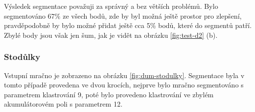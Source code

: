 \documentclass[11pt,twoside,a4paper]{book}
\begin{document}
Výsledek segmentace považuji za správný a bez větších problémů. Bylo segmentováno 67\% ze všech bodů, zde by byl možná ještě prostor pro zlepšení, pravděpodobně by bylo možné přidat ještě cca 5\% bodů, které do segmentů patří. Zbylé body jsou však jen šum, jak je vidět na obrázku \ref{fig:test-d2} (b). 

\cleardoublepage
\subsubsection{Stodůlky}

Vstupní mračno je zobrazeno na obrázku \ref{fig:dum-stodulky}. Segmentace byla v tomto případě provedena ve dvou krocích, nejprve bylo mračno segmentováno s parametrem klastrování 9, poté bylo provedeno klastrování ve zbylém akumulátorovém poli s parametrem 12.
\end{document}
